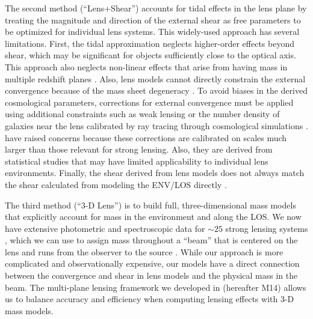 \documentclass{emulateapj}
\begin{document}
The second method (``Lens+Shear'') accounts for tidal effects in the lens plane by treating the magnitude and direction of the external shear as free parameters to be optimized for individual lens systems. This widely-used approach has several limitations. First, the tidal approximation neglects higher-order effects beyond shear, which may be significant for objects sufficiently close to the optical axis. This approach also neglects non-linear effects that arise from having mass in multiple redshift planes \citep[][]{McCully14,Jaroszynski12}. Also, lens models cannot directly constrain the external convergence because of the mass sheet degeneracy \citep{Falco85}.  To avoid biases in the derived cosmological parameters, corrections for external convergence must be applied using additional constraints such as weak lensing \citep{Nakajima09, Fadely10} or the number density of galaxies near the lens \citep{Suyu10, Suyu13, Collett13} calibrated by ray tracing through cosmological simulations \citep[e.g.,][]{Hilbert09}. \citet{Schneider13} have raised concerns because these corrections are calibrated on scales much larger than those relevant for strong lensing.  Also, they are derived from statistical studies that may have limited applicability to individual lens environments. Finally, the shear derived from lens models does not always match the shear calculated from modeling the ENV/LOS directly \citep{Wong11}.

The third method (``3-D Lens'') is to build full, three-dimensional mass models that explicitly account for mass in the environment and along the LOS.  We now have extensive photometric and spectroscopic data for $\sim25$ strong lensing systems \citep{Momcheva06,Williams08,Momcheva15}, which we can use to assign mass throughout a ``beam'' that is centered on the lens and runs from the observer to the source \citep[see][]{Wong11}.  While our approach is more complicated and observationally expensive, our models have a direct connection between the convergence and shear in lens models and the physical mass in the beam. The multi-plane lensing framework we developed in \citet{McCully14} (hereafter M14) allows us to balance accuracy and efficiency when computing lensing effects with 3-D mass models.
\end{document}
